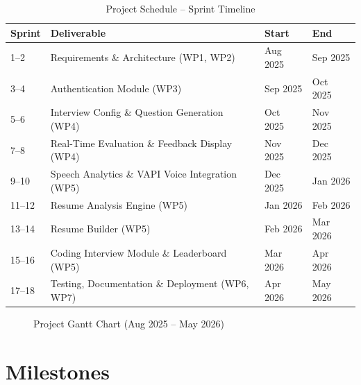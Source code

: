 \documentclass[12pt,a4paper,oneside]{report}
\begin{document}
\begin{table}[H]
\centering
\caption{Project Schedule -- Sprint Timeline}
\label{tab:gantt}
\begin{tabular}{|p{1.8cm}|p{4cm}|p{3.5cm}|p{3.5cm}|}
\hline
\textbf{Sprint} & \textbf{Deliverable} & \textbf{Start} & \textbf{End} \\
\hline
1--2 & Requirements \& Architecture (WP1, WP2) & Aug 2025 & Sep 2025 \\
\hline
3--4 & Authentication Module (WP3) & Sep 2025 & Oct 2025 \\
\hline
5--6 & Interview Config \& Question Generation (WP4) & Oct 2025 & Nov 2025 \\
\hline
7--8 & Real-Time Evaluation \& Feedback Display (WP4) & Nov 2025 & Dec 2025 \\
\hline
9--10 & Speech Analytics \& VAPI Voice Integration (WP5) & Dec 2025 & Jan 2026 \\
\hline
11--12 & Resume Analysis Engine (WP5) & Jan 2026 & Feb 2026 \\
\hline
13--14 & Resume Builder (WP5) & Feb 2026 & Mar 2026 \\
\hline
15--16 & Coding Interview Module \& Leaderboard (WP5) & Mar 2026 & Apr 2026 \\
\hline
17--18 & Testing, Documentation \& Deployment (WP6, WP7) & Apr 2026 & May 2026 \\
\hline
\end{tabular}
\end{table}

\begin{figure}[H]
\centering
{}
\caption{Project Gantt Chart (Aug 2025 -- May 2026)}
\label{fig:gantt}
\end{figure}


\section{Milestones}
\label{sec:milestones}
\end{document}
